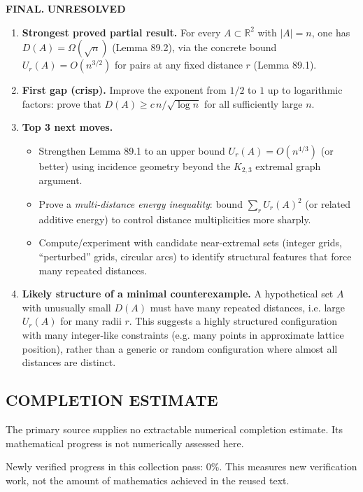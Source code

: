 \medskip
\noindent\textbf{FINAL.} \textbf{UNRESOLVED}
\begin{enumerate}
\item[(i)] \textbf{Strongest proved partial result.}
For every $A\subset\mathbb{R}^2$ with $|A|=n$, one has $D(A)=\Omega(\sqrt n)$ (Lemma 89.2), via the concrete bound $U_r(A)=O(n^{3/2})$ for pairs at any fixed distance $r$ (Lemma 89.1).
\item[(ii)] \textbf{First gap (crisp).}
Improve the exponent from $1/2$ to $1$ up to logarithmic factors: prove that $D(A)\ge c\,n/\sqrt{\log n}$ for all sufficiently large $n$.
\item[(iii)] \textbf{Top 3 next moves.}
\begin{itemize}
\item Strengthen Lemma 89.1 to an upper bound $U_r(A)=O(n^{4/3})$ (or better) using incidence geometry beyond the $K_{2,3}$ extremal graph argument.
\item Prove a \emph{multi-distance energy inequality}: bound $\sum_r U_r(A)^2$ (or related additive energy) to control distance multiplicities more sharply.
\item Compute/experiment with candidate near-extremal sets (integer grids, ``perturbed'' grids, circular arcs) to identify structural features that force many repeated distances.
\end{itemize}
\item[(iv)] \textbf{Likely structure of a minimal counterexample.}
A hypothetical set $A$ with unusually small $D(A)$ must have many repeated distances, i.e. large $U_r(A)$ for many radii $r$. This suggests a highly structured configuration with many integer-like constraints (e.g. many points in approximate lattice position), rather than a generic or random configuration where almost all distances are distinct.
\end{enumerate}




\subsection*{COMPLETION ESTIMATE}
The primary source supplies no extractable numerical completion estimate. Its mathematical progress is not numerically assessed here.

Newly verified progress in this collection pass: $0\%$. This measures new verification work, not the amount of mathematics achieved in the reused text.
